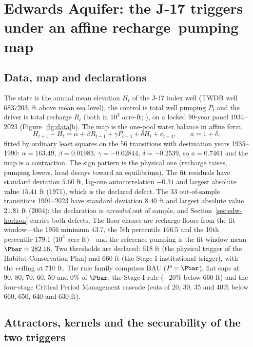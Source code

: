 \section{Edwards Aquifer: the J-17 triggers under an affine recharge--pumping map}\label{sec:edwards}

\subsection{Data, map and declarations}\label{sec:edw-data}

The state is the annual mean elevation $H_t$ of the J-17 index well (TWDB well 6837203, ft above mean sea level), the control is total well pumping $P_t$ and the driver is total recharge $R_t$ (both in $10^3$ acre-ft; \cite{Umphres2025,EAA2023,TWDB}), on a locked 90-year panel 1934--2023 (Figure~\ref{fig:data}b). The map is the one-pool water balance in affine form,
\begin{equation}\label{eq:edw-map}
H_{t+1}-H_t=\alpha+\beta R_{t+1}+\gamma P_{t+1}+\delta H_t+e_{t+1},\qquad a=1+\delta,
\end{equation}
fitted by ordinary least squares on the 56 transitions with destination years 1935--1990: $\alpha=163.49$, $\beta=0.01983$, $\gamma=-0.02844$, $\delta=-0.2539$, so $a=0.7461$ and the map is a contraction. The sign pattern is the physical one (recharge raises, pumping lowers, head decays toward an equilibrium). The fit residuals have standard deviation $5.60$ ft, lag-one autocorrelation $-0.31$ and largest absolute value $15.41$ ft (1971), which is the declared defect. The 33 out-of-sample transitions 1991--2023 have standard deviation $8.40$ ft and largest absolute value $21.81$ ft (2004): the declaration is \emph{exceeded} out of sample, and Section~\ref{sec:edw-horizon} carries both defects. The floor classes are recharge floors from the fit window---the 1956 minimum $43.7$, the 5th percentile $166.5$ and the 10th percentile $179.1$ ($10^3$ acre-ft)---and the reference pumping is the fit-window mean $\Pbar=282.16$. Two thresholds are declared: 618 ft (the physical trigger of the Habitat Conservation Plan) and 660 ft (the Stage-I institutional trigger), with the ceiling at 710 ft. The rule family comprises BAU ($P=\Pbar$), flat caps at 90, 80, 70, 60, 50 and 0\% of $\Pbar$, the Stage-I rule ($-20\%$ below 660 ft) and the four-stage Critical Period Management cascade (cuts of 20, 30, 35 and 40\% below 660, 650, 640 and 630 ft).

\subsection{Attractors, kernels and the securability of the two triggers}\label{sec:edw-kernels}

